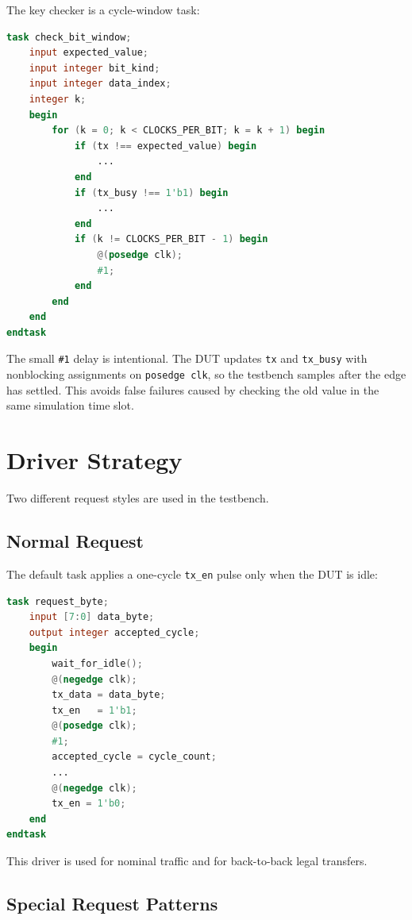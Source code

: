 \documentclass[12pt]{article}
\begin{document}
The key checker is a cycle-window task:

\begin{lstlisting}[language=Verilog]
task check_bit_window;
    input expected_value;
    input integer bit_kind;
    input integer data_index;
    integer k;
    begin
        for (k = 0; k < CLOCKS_PER_BIT; k = k + 1) begin
            if (tx !== expected_value) begin
                ...
            end
            if (tx_busy !== 1'b1) begin
                ...
            end
            if (k != CLOCKS_PER_BIT - 1) begin
                @(posedge clk);
                #1;
            end
        end
    end
endtask
\end{lstlisting}

The small \texttt{\#1} delay is intentional. The DUT updates \texttt{tx} and
\texttt{tx\_busy} with nonblocking assignments on \texttt{posedge clk}, so the
testbench samples after the edge has settled. This avoids false failures caused
by checking the old value in the same simulation time slot.

\section{Driver Strategy}

Two different request styles are used in the testbench.

\subsection*{Normal Request}

The default task applies a one-cycle \texttt{tx\_en} pulse only when the DUT is
idle:

\begin{lstlisting}[language=Verilog]
task request_byte;
    input [7:0] data_byte;
    output integer accepted_cycle;
    begin
        wait_for_idle();
        @(negedge clk);
        tx_data = data_byte;
        tx_en   = 1'b1;
        @(posedge clk);
        #1;
        accepted_cycle = cycle_count;
        ...
        @(negedge clk);
        tx_en = 1'b0;
    end
endtask
\end{lstlisting}

This driver is used for nominal traffic and for back-to-back legal transfers.

\subsection*{Special Request Patterns}
\end{document}
